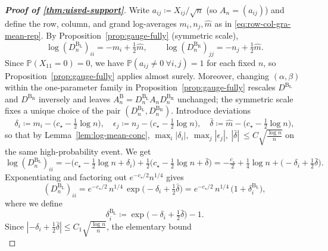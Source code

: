 \documentclass[11pt,a4paper]{article}
\newcommand{\Prob}{\mathbb{P}}
\begin{document}
\begin{proof}[\textbf{Proof of \cref{thm:uisvd-support}}]\label{proof-of-thm2}
Write $a_{ij}\coloneq X_{ij}/\sqrt n$ (so $A_n=(a_{ij})$) and define the row, column, and grand log-averages $m_i,n_j,\hat{m}$ as in \cref{eq:row-col-gra-mean-rep}. By Proposition~\ref{prop:gauge-fully} (symmetric scale),
\begin{equation}\label{eq:gauge-symmetric-log}
\log(D^{\mathrm{B_L}}_{n})_{ii}=-m_i+\tfrac12\hat{m},\qquad
\log(D^{\mathrm{B_R}}_{n})_{jj}=-n_j+\tfrac12\hat{m}.
\end{equation}
Since $\Prob(X_{11}=0)=0$, we have $\Prob(a_{ij}\neq 0\ \forall i,j)=1$ for each fixed $n$, so Proposition~\ref{prop:gauge-fully} applies almost surely. Moreover, changing $(\alpha,\beta)$ within the one-parameter family in Proposition~\ref{prop:gauge-fully} rescales $D^{\mathrm{B_L}}$ and $D^{\mathrm{B_R}}$ inversely and leaves
$A_n^{\mathrm B}=D^{\mathrm{B_L}}_nA_nD^{\mathrm{B_R}}_n$ unchanged; the symmetric scale fixes a unique choice of the pair $(D^{\mathrm{B_L}}_n,D^{\mathrm{B_R}}_n)$. Introduce deviations
\begin{equation}\label{eq:83ref}
\delta_i\coloneq m_i-\Big(c_\star-\tfrac12\log n\Big),\quad
\epsilon_j\coloneq n_j-\Big(c_\star-\tfrac12\log n\Big),\quad
\bar\delta\coloneq \hat{m}-\Big(c_\star-\tfrac12\log n\Big),
\end{equation}
so that by Lemma~\ref{lem:log-mean-conc}, $\max_i|\delta_i|,\ \max_j|\epsilon_j|,\ |\bar\delta|\ \le C\sqrt{\tfrac{\log n}{n}}$ on the same high-probability event. We get
\begin{equation}\label{eq:repeat-ui-stretch}
\log(D^{\mathrm{B_L}}_{n})_{ii}
= -\Big(c_\star-\tfrac12\log n+\delta_i\Big)+\tfrac12\Big(c_\star-\tfrac12\log n+\bar\delta\Big)
= -\tfrac{c_\star}{2}+\tfrac14\log n + \Big(-\delta_i+\tfrac12\bar\delta\Big).
\end{equation}
Exponentiating and factoring out $e^{-c_\star/2}n^{1/4}$ gives
\begin{equation}\label{eq:DL-exp}
(D^{\mathrm{B_L}}_{n})_{ii}=e^{-c_\star/2}\,n^{1/4}\,\exp\!\Big(-\delta_i+\tfrac12\bar\delta\Big)
= e^{-c_\star/2}\,n^{1/4}\,\big(1+\delta^{\mathrm{B_L}}_i\big),
\end{equation}
where we define
\begin{equation}
\delta^{\mathrm{B_L}}_i\coloneq \exp\!\Big(-\delta_i+\tfrac12\bar\delta\Big)-1.
\end{equation}
Since $|-\delta_i+\tfrac12\bar\delta|\le C_1\sqrt{\tfrac{\log n}{n}}$, the elementary bound
\begin{equation}

\end{equation}
\end{proof}
\end{document}
